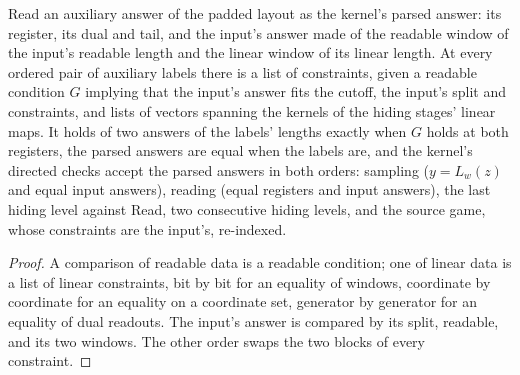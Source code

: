 \begin{lemma}
\label{lem:intro-aux-cons}
\leanok
Read an auxiliary answer of the padded layout as the kernel's parsed answer: its register, its
dual and tail, and the input's answer made of the readable window of the input's readable length
and the linear window of its linear length. At every ordered pair of auxiliary labels there is a
list of constraints, given a readable condition $G$ implying that the input's answer fits the
cutoff, the input's split and constraints, and lists of vectors spanning the kernels of the
hiding stages' linear maps. It holds of two answers of the labels' lengths exactly when $G$
holds at both registers, the parsed answers are equal when the labels are, and the kernel's
directed checks accept the parsed answers in both orders: sampling ($y = L_w(z)$ and equal input
answers), reading (equal registers and input answers), the last hiding level against Read, two
consecutive hiding levels, and the source game, whose constraints are the input's, re-indexed.
\end{lemma}

\begin{proof}
\leanok
A comparison of readable data is a readable condition; one of linear data is a list of linear
constraints, bit by bit for an equality of windows, coordinate by coordinate for an equality on a
coordinate set, generator by generator for an equality of dual readouts. The input's answer is
compared by its split, readable, and its two windows. The other order swaps the two blocks of
every constraint.
\end{proof}

